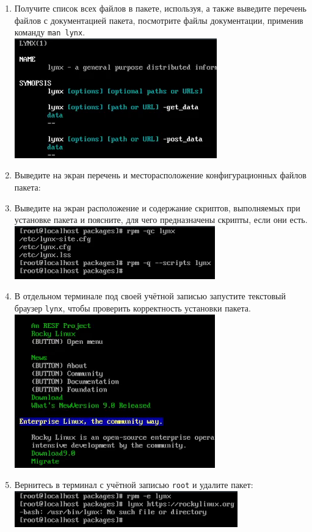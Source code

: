 \documentclass[12pt]{article}
\begin{document}
\begin{enumerate}
	\item Получите список всех файлов в пакете, используя, а также выведите перечень файлов с документацией пакета, посмотрите файлы документации, применив команду \texttt{man lynx}.
	      \\\includegraphics{9.png}
	\item Выведите на экран перечень и месторасположение конфигурационных файлов пакета:
	\item Выведите на экран расположение и содержание скриптов, выполняемых при установке пакета и поясните, для чего предназначены скрипты, если они есть.
	      \\\includegraphics{10.png}
	\item В отдельном терминале под своей учётной записью запустите текстовый браузер \texttt{lynx}, чтобы проверить корректность установки пакета.
	      \\\includegraphics{11.png}
	\item Вернитесь в терминал с учётной записью \texttt{root} и удалите пакет:
	      \\\includegraphics{12.png}
\end{enumerate}
\end{document}
